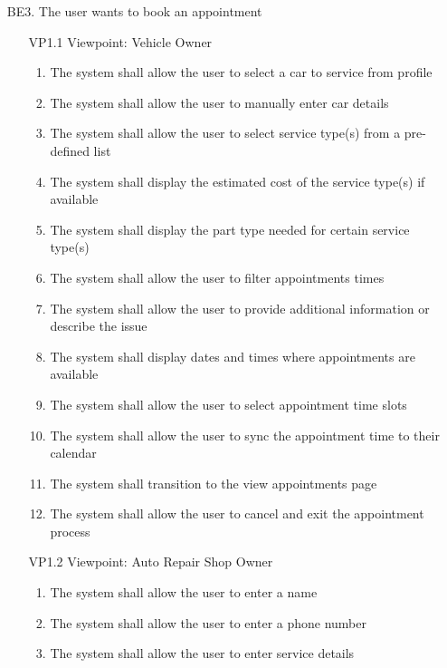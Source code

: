 \documentclass[12pt]{article}
\begin{document}
\begin{enumerate}
	\item [{BE}3.] The user wants to book an appointment
	      \begin{enumerate}
		      \item [{VP1}.1] Viewpoint: Vehicle Owner
		            \begin{enumerate}
			            \item The system shall allow the user to select a car to service from profile
			            \item The system shall allow the user to manually enter car details
			            \item The system shall allow the user to select service type(s) from a pre-defined list
			            \item The system shall display the estimated cost of the service type(s) if available
			            \item The system shall display the part type needed for certain service type(s)
			            \item The system shall allow the user to filter appointments times
			            \item The system shall allow the user to provide additional information or describe the issue
			            \item The system shall display dates and times where appointments are available
			            \item The system shall allow the user to select appointment time slots
			            \item The system shall allow the user to sync the appointment time to their calendar
			            \item The system shall transition to the view appointments page
			            \item The system shall allow the user to cancel and exit the appointment process
		            \end{enumerate}
	      \end{enumerate}
	      \begin{enumerate}
		      \item [{VP1}.2] Viewpoint: Auto Repair Shop Owner
		            \begin{enumerate}
			            \item The system shall allow the user to enter a name
			            \item The system shall allow the user to enter a phone number
			            \item The system shall allow the user to enter service details

\end{enumerate}
\end{enumerate}
\end{enumerate}
\end{document}

